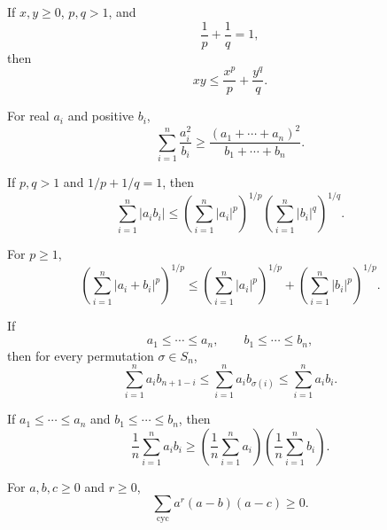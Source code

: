     \begin{theorem}
        If $x,y\geq0$, $p,q>1$, and
        \[
            \frac1p+\frac1q=1,
        \]
        then
        \[
            xy\leq\frac{x^p}{p}+\frac{y^q}{q}.
        \]
    \end{theorem}

    \begin{theorem}
        For real $a_i$ and positive $b_i$,
        \[
            \sum_{i=1}^{n}\frac{a_i^2}{b_i}
            \geq
            \frac{(a_1+\cdots+a_n)^2}{b_1+\cdots+b_n}.
        \]
    \end{theorem}

    \begin{theorem}
        If $p,q>1$ and $1/p+1/q=1$, then
        \[
            \sum_{i=1}^{n}|a_ib_i|
            \leq
            \left(\sum_{i=1}^{n}|a_i|^p\right)^{1/p}
            \left(\sum_{i=1}^{n}|b_i|^q\right)^{1/q}.
        \]
    \end{theorem}

    \begin{theorem}
        For $p\geq1$,
        \[
            \left(\sum_{i=1}^{n}|a_i+b_i|^p\right)^{1/p}
            \leq
            \left(\sum_{i=1}^{n}|a_i|^p\right)^{1/p}
            +
            \left(\sum_{i=1}^{n}|b_i|^p\right)^{1/p}.
        \]
    \end{theorem}

    \begin{theorem}
        If
        \[
            a_1\leq\cdots\leq a_n,
            \qquad
            b_1\leq\cdots\leq b_n,
        \]
        then for every permutation $\sigma\in S_n$,
        \[
            \sum_{i=1}^{n}a_ib_{n+1-i}
            \leq
            \sum_{i=1}^{n}a_ib_{\sigma(i)}
            \leq
            \sum_{i=1}^{n}a_ib_i.
        \]
    \end{theorem}

    \begin{theorem}
        If $a_1\leq\cdots\leq a_n$ and $b_1\leq\cdots\leq b_n$, then
        \[
            \frac1n\sum_{i=1}^{n}a_ib_i
            \geq
            \left(\frac1n\sum_{i=1}^{n}a_i\right)
            \left(\frac1n\sum_{i=1}^{n}b_i\right).
        \]
    \end{theorem}

    \begin{theorem}
        For $a,b,c\geq0$ and $r\geq0$,
        \[
            \sum_{\mathrm{cyc}}a^r(a-b)(a-c)\geq0.
        \]
    \end{theorem}

